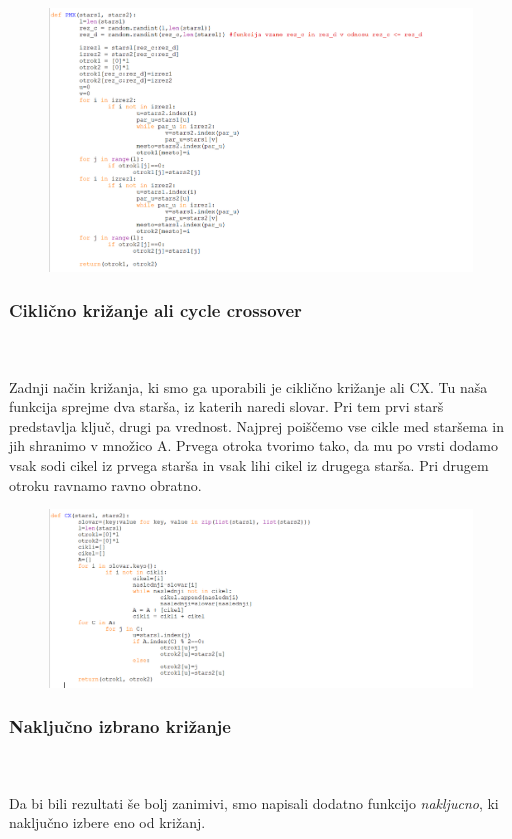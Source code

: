\documentclass[12pt,a4paper]{amsart}
\theoremstyle{definition} %
\theoremstyle{plain} %
\begin{document}
\begin{figure}[ht]
\centering
\includegraphics[width=1\textwidth]{PMX}
\end{figure}
\newpage
\subsubsection{Ciklično križanje ali cycle crossover}
\
\\
\\
Zadnji način križanja, ki smo ga uporabili je ciklično križanje ali CX. Tu naša funkcija sprejme dva starša, iz katerih naredi slovar. Pri tem prvi starš predstavlja ključ, drugi pa vrednost. Najprej poiščemo vse cikle med staršema in jih shranimo v množico A. Prvega otroka tvorimo tako, da mu po vrsti dodamo vsak sodi cikel iz prvega starša in vsak lihi cikel iz drugega starša. Pri drugem otroku ravnamo ravno obratno.  

\begin{figure}[ht]
\centering
\includegraphics[width=1\textwidth]{CX}
\end{figure}

\subsubsection{Naključno izbrano križanje}
\
\\
\\
Da bi bili rezultati še bolj zanimivi, smo napisali dodatno funkcijo \textit{nakljucno}, ki naključno izbere eno od križanj. 
\end{document}
